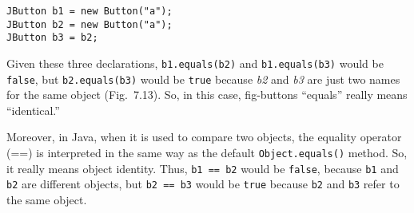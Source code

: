 \begin{jjjlisting}
\begin{lstlisting}
JButton b1 = new Button("a");
JButton b2 = new Button("a");
JButton b3 = b2;
\end{lstlisting}
\end{jjjlisting}

\noindent Given these three declarations, {\tt b1.equals(b2)}
and {\tt b1.equals(b3)} would be {\tt false}, but {\tt b2.equals(b3)}
would be {\tt true} because {\it b2} and {\it b3} are just two
names for the same object (Fig.~7.13). So, in this case,
{fig-buttons}
``equals'' really means ``identical.''

Moreover, in Java, when it is used to compare two objects, the equality operator
(==) is interpreted in the same way as the default {\tt Object.equals()}
method.   So, it really means object identity.   Thus, {\tt b1 == b2} 
would be {\tt false}, because {\tt b1} and {\tt b2}
are different objects, but {\tt b2 == b3} would be {\tt true} because
{\tt b2} and {\tt b3} refer to the same object.


